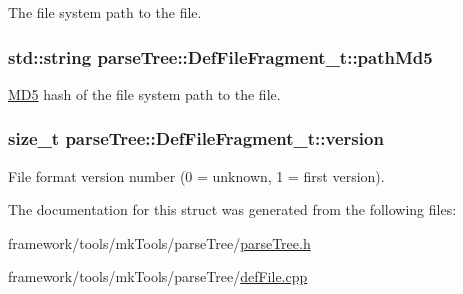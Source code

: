 The file system path to the file. 

\subsubsection[{\texorpdfstring{path\+Md5}{pathMd5}}]{\setlength{\rightskip}{0pt plus 5cm}std\+::string parse\+Tree\+::\+Def\+File\+Fragment\+\_\+t\+::path\+Md5}\hypertarget{structparse_tree_1_1_def_file_fragment__t_a4ecda92bd4d75e84634b7be46e0c214a}{}\label{structparse_tree_1_1_def_file_fragment__t_a4ecda92bd4d75e84634b7be46e0c214a}


\hyperlink{class_m_d5}{M\+D5} hash of the file system path to the file. 

\subsubsection[{\texorpdfstring{version}{version}}]{\setlength{\rightskip}{0pt plus 5cm}size\+\_\+t parse\+Tree\+::\+Def\+File\+Fragment\+\_\+t\+::version}\hypertarget{structparse_tree_1_1_def_file_fragment__t_a8ca0d54f111d6b0aa5af10e76cacd586}{}\label{structparse_tree_1_1_def_file_fragment__t_a8ca0d54f111d6b0aa5af10e76cacd586}


File format version number (0 = unknown, 1 = first version). 



The documentation for this struct was generated from the following files\+:\begin{DoxyCompactItemize}
\item 
framework/tools/mk\+Tools/parse\+Tree/\hyperlink{parse_tree_8h}{parse\+Tree.\+h}\item 
framework/tools/mk\+Tools/parse\+Tree/\hyperlink{def_file_8cpp}{def\+File.\+cpp}\end{DoxyCompactItemize}

